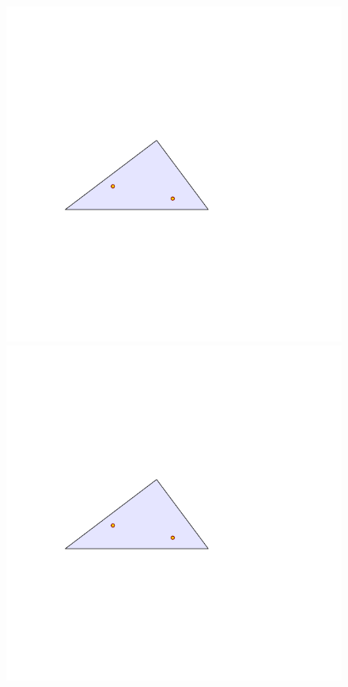 \documentclass[12pt]{article}%
\begin{document}
\begin{figure}[h]
    \includegraphics[page=3]{figs/narrow_triangle} \hfill
    \includegraphics[page=4]{figs/narrow_triangle}
    \caption{}
\end{figure}
\end{document}
